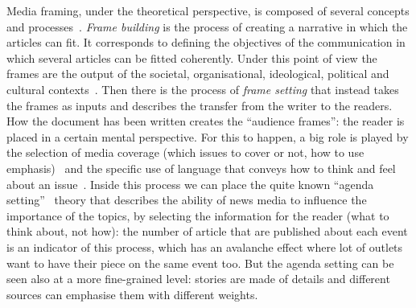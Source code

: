 Media framing, under the theoretical perspective, is composed of several concepts and processes~\cite{scheufele2007framing}.
\textit{Frame building} is the process of creating a narrative in which the articles can fit. It corresponds to defining the objectives of the communication in which several articles can be fitted coherently. Under this point of view the frames are the output of the societal, organisational, ideological, political and cultural contexts~\cite{scheufele1999framing}.
Then there is the process of \textit{frame setting} that instead takes the frames as inputs and describes the transfer from the writer to the readers. How the document has been written creates the ``audience frames'': the reader is placed in a certain mental perspective. For this to happen, a big role is played by the selection of media coverage (which issues to cover or not, how to use emphasis)~\cite{iyengar1994anyone} and the specific use of language that conveys how to think and feel about an issue~\cite{bryant2012fundamentals}.
Inside this process we can place the quite known ``agenda setting''~\cite{mccombs1972agenda} theory that describes the ability of news media to influence the importance of the topics, by selecting the information for the reader (what to think about, not how): %
the number of article that are published about each event is an indicator of this process, which has an avalanche effect where lot of outlets want to have their piece on the same event too.
But the agenda setting can be seen also at a more fine-grained level: stories are made of details and different sources can emphasise them with different weights.


